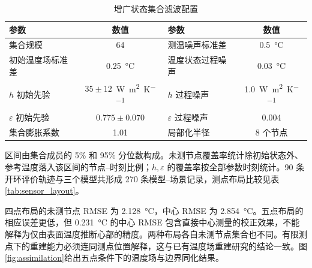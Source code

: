 \begin{table}[H]
  \centering
  \caption{增广状态集合滤波配置}
  \label{tab:enkf_config}
  \begin{tabular}{lc@{\qquad}lc}
    \toprule
    参数 & 数值 & 参数 & 数值 \\
    \midrule
    集合规模 & 64 & 测温噪声标准差 & \SI{0.5}{\degreeCelsius} \\
    初始温度场标准差 & \SI{0.25}{\degreeCelsius} & 温度状态过程噪声 & \SI{0.03}{\degreeCelsius} \\
    $h$ 初始先验 & $35\pm12$~\si{\watt\per\square\metre\per\kelvin} & $h$ 过程噪声 & \SI{1.0}{\watt\per\square\metre\per\kelvin} \\
    $\varepsilon$ 初始先验 & $0.775\pm0.070$ & $\varepsilon$ 过程噪声 & 0.004 \\
    集合膨胀系数 & 1.01 & 局部化半径 & 8 个节点 \\
    \bottomrule
  \end{tabular}
\end{table}

区间由集合成员的 5\% 和 95\% 分位数构成。未测节点覆盖率统计除初始状态外、参考温度落入该区间的节点--时刻比例；$h,\varepsilon$ 的覆盖率按全部参数时刻统计。90 条开环评价轨迹与三个模型共形成 270 条模型--场景记录，测点布局比较见表\ref{tab:sensor_layout}。

\begin{table}[H]
  \centering
  \caption{稀疏测点布局的温度场重建结果，RMSE 单位：\si{\degreeCelsius}}
  \label{tab:sensor_layout}
  \small
\end{table}

四点布局的未测节点 RMSE 为 \SI{2.128}{\degreeCelsius}，中心 RMSE 为 \SI{2.854}{\degreeCelsius}。五点布局的相应误差更低，但 \SI{0.231}{\degreeCelsius} 的中心 RMSE 包含直接中心测量的校正效果，不能解释为仅由表面温度推断心部的精度。两种布局各自未测节点集合也不同。有限测点下的重建能力必须连同测点位置解释，这与已有温度场重建研究的结论一致\cite{liu2022reconstruction}。图\ref{fig:assimilation}给出五点条件下的温度场与边界同化结果。

